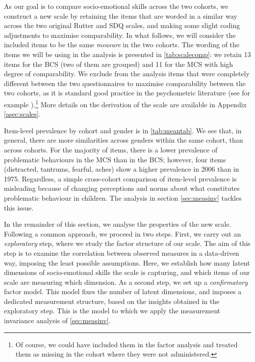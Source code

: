 As our goal is to compare socio-emotional skills across the two cohorts, we construct a new scale by retaining the items that are worded in a similar way across the two original Rutter and SDQ scales, and making some slight coding adjustments to maximise comparability. In what follows, we will consider the included items to be the same \emph{measure} in the two cohorts. The wording of the items we will be using in the analysis is presented in \autoref{tab:scalecomp}: we retain 13 items for the BCS (two of them are grouped) and 11 for the MCS with high degree of comparability. We exclude from the analysis items that were completely different between the two questionnaires to maximise comparability between the two cohorts, as it is standard good practice in the psychometric literature (see for example \citet{Kern2014}).\footnote{Of course, we could have included them in the factor analysis and treated them as missing in the cohort where they were not administered.} More details on the derivation of the scale are available in Appendix \autoref{asec:scales}.

Item-level prevalence by cohort and gender is in \autoref{tab:meantab}. We see that, in general, there are more similarities across genders within the same cohort, than across cohorts. For the majority of items, there is a lower prevalence of problematic behaviours in the MCS than in the BCS; however, four items (distracted, tantrums, fearful, aches) show a higher prevalence in 2006 than in 1975. Regardless, a simple cross-cohort comparison of item-level prevalence is misleading because of changing perceptions and norms about what constitutes problematic behaviour in children. The analysis in section \ref{sec:measinv} tackles this issue.

In the remainder of this section, we analyse the properties of the new scale. Following a common approach, we proceed in two steps. First, we carry out an \emph{exploratory} step, where we study the factor structure of our scale. The aim of this step is to examine the correlation between observed measures in a data-driven way, imposing the least possible assumptions. Here, we establish how many latent dimensions of socio-emotional skills the scale is capturing, and which items of our scale are measuring which dimension. As a second step, we set up a \emph{confirmatory} factor model. This model fixes the number of latent dimensions, and imposes a dedicated measurement structure, based on the insights obtained in the exploratory step. This is the model to which we apply the measurement invariance analysis of \autoref{sec:measinv}.

